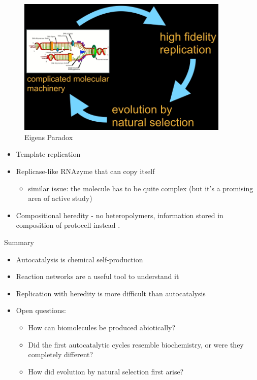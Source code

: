 \documentclass[]{article}
\begin{document}
 
\begin{figure}[H]
	\caption{Eigens Paradox}\label{fig:EigensParadox}
	\includegraphics[width=0.9\textwidth]{EigensParadox}
\end{figure}

\begin{itemize}
	\item Template replication
	\item  Replicase-like RNAzyme that can copy itself
	\begin{itemize}
		\item similar issue: the molecule has to be quite complex
		(but it’s a promising area of active study)
	\end{itemize}
	\item Compositional heredity - no heteropolymers,
	information stored in composition of protocell instead\cite{vasas2012evolution} \cite{segre2000compositional}.
\end{itemize}

Summary

\begin{itemize}
	\item Autocatalysis is chemical self-production
	\item Reaction networks are a useful tool to understand it
	\item Replication with heredity is more difficult than autocatalysis
	\item Open questions:
	\begin{itemize}
		\item  How can biomolecules be produced abiotically?
		\item Did the first autocatalytic cycles resemble biochemistry,
		or were they completely different?
		\item How did evolution by natural selection first arise?
	\end{itemize}
\end{itemize}
\end{document}
